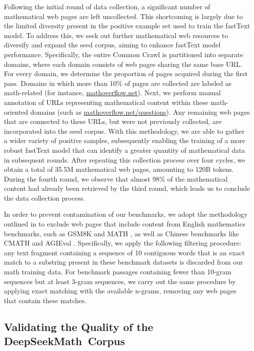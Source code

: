 \begin{itemize}[topsep=0pt]
Following the initial round of data collection, a significant number of mathematical web pages are left uncollected. This shortcoming is largely due to the limited diversity present in the positive example set used to train the fastText model. To address this, we seek out further mathematical web resources to diversify and expand the seed corpus, aiming to enhance fastText model performance. Specifically, the entire Common Crawl is partitioned into separate domains, where each domain consists of web pages sharing the same base URL. For every domain, we determine the proportion of pages acquired during the first pass. Domains in which more than 10\% of pages are collected are labeled as math-related (for instance, \url{mathoverflow.net}).
Next, we perform manual annotation of URLs representing mathematical content within these math-oriented domains (such as \url{mathoverflow.net/questions}). Any remaining web pages that are connected to these URLs, but were not previously collected, are incorporated into the seed corpus. With this methodology, we are able to gather a wider variety of positive samples, subsequently enabling the training of a more robust fastText model that can identify a greater quantity of mathematical data in subsequent rounds. After repeating this collection process over four cycles, we obtain a total of 35.5M mathematical web pages, amounting to 120B tokens. During the fourth round, we observe that almost 98\% of the mathematical content had already been retrieved by the third round, which leads us to conclude the data collection process.

In order to prevent contamination of our benchmarks, we adopt the methodology outlined in \cite{deepseek-coder} to exclude web pages that include content from English mathematics benchmarks, such as GSM8K \citep{gsm8k} and MATH \citep{MATH}, as well as Chinese benchmarks like CMATH \citep{wei2023cmath} and AGIEval \citep{agieval}. Specifically, we apply the following filtering procedure: any text fragment containing a sequence of 10 contiguous words that is an exact match to a substring present in these benchmark datasets is discarded from our math training data. For benchmark passages containing fewer than 10-gram sequences but at least 3-gram sequences, we carry out the same procedure by applying exact matching with the available n-grams, removing any web pages that contain these matches.

\subsection{Validating the Quality of the DeepSeekMath~Corpus}


\end{itemize}
